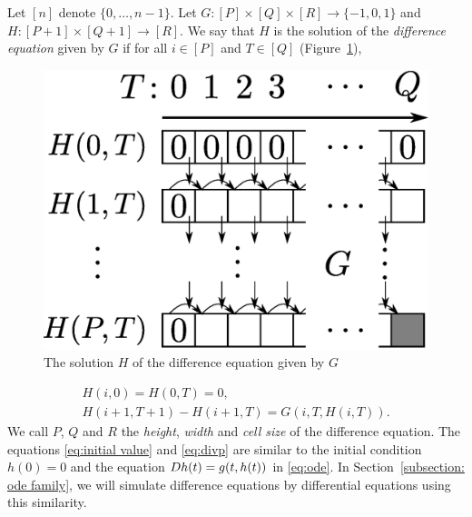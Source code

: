 Let $[n]$ denote $\{0, \dots , n-1\}$.
Let $G \colon [P] \times [Q] \times [R] \to \{-1, 0, 1\}$ and
$H \colon [P + 1] \times [Q+1] \to [R]$. 
We say that $H$ is the solution of the \emph{difference equation} given by $G$
if for all $i \in [P]$ and $T \in [Q]$ (Figure~\ref{fig:divp}), 
\begin{figure}
 \begin{center}
  \includegraphics[height=0.15\textheight]{image/divp.eps}
 \end{center}
 \caption{The solution $H$ of the difference equation given by $G$}
 \label{fig:divp}
\end{figure}
\begin{gather}
   H(i, 0) = H(0, T) = 0, \label{eq:initial value}
\\
   H(i + 1, T + 1) - H(i+1, T) = G(i, T, H(i, T)).  \label{eq:divp}
\end{gather}
We call $P$, $Q$ and $R$ the \emph{height}, \emph{width} and \emph{cell size} of
the difference equation.
The equations \eqref{eq:initial value} and \eqref{eq:divp} are similar to 
the initial condition $h(0) = 0$ and the equation $D h(t) = g(t, h(t))$ 
in \eqref{eq:ode}.
In Section~\ref{subsection: ode family}, we will simulate difference equations by differential equations using this similarity.

